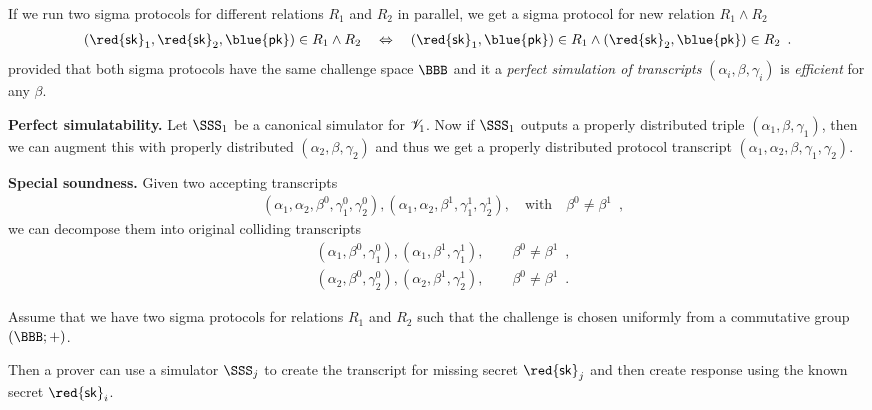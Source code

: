 \documentclass[landscape,footrule]{foils}
\renewcommand{\SK}{{\red{\mathsf{sk}}}}
\renewcommand{\PK}{{\blue{\mathsf{pk}}}}
\begin{document}

\enlargethispage{1cm}

If we run two sigma protocols for different relations $R_1$ and $R_2$
in parallel, we get a sigma protocol for new relation $R_1\wedge
R_2$
\begin{align*}
  (\SK_1,\SK_2,\PK)\in R_1\wedge R_2
  \quad\Leftrightarrow\quad
  (\SK_1,\PK)\in R_1\wedge (\SK_2,\PK)\in R_2\enspace.
\end{align*}
provided that both sigma protocols have the same challenge space
$\BBB$ and it a \emph{perfect simulation of transcripts}
$(\alpha_i,\beta,\gamma_i)$ is \emph{efficient} for any $\beta$.


\textbf{Perfect simulatability.}  Let $\SSS_1$ be a canonical
simulator for $\mathscr{V}_1$. Now if $\SSS_1$ outputs a properly
distributed triple $(\alpha_1,\beta,\gamma_1)$, then we can augment
this with properly distributed $(\alpha_2,\beta,\gamma_2)$ and thus we
get a properly distributed protocol transcript
$(\alpha_1,\alpha_2,\beta,\gamma_1,\gamma_2)$.
\Bigskip

\textbf{Special soundness.}  Given two accepting transcripts
\begin{align*}
  &(\alpha_1,\alpha_2,\beta^0,\gamma_1^0,\gamma_2^0),
  (\alpha_1,\alpha_2,\beta^1,\gamma_1^1,\gamma_2^1), 
 \quad\text{with}\quad \beta^0\neq\beta^1\enspace, 
\end{align*}
we can decompose them into original colliding transcripts
\begin{align*}
  &(\alpha_1,\beta^0,\gamma_1^0),(\alpha_1,\beta^1,\gamma_1^1),\qquad \beta^0\neq\beta^1\enspace,\\
  &(\alpha_2,\beta^0,\gamma_2^0),(\alpha_2,\beta^1,\gamma_2^1),\qquad \beta^0\neq\beta^1\enspace.
\end{align*}


%
Assume that we have two sigma protocols for relations $R_1$ and $R_2$
such that the challenge is chosen uniformly from a commutative group
$(\BBB;+)$.

Then a prover can use a simulator $\SSS_j$ to create the transcript
for missing secret $\SK_j$ and then create response using the known
secret $\SK_i$.
\end{document}
